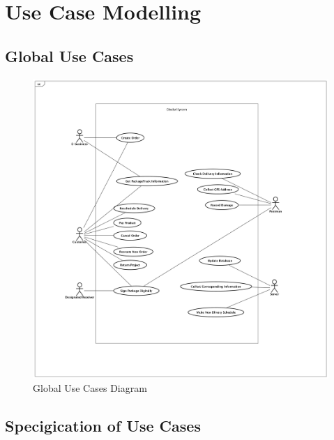 \documentclass[12pt]{scrreprt}
\begin{document}
\chapter{Use Case Modelling}
\section{Global Use Cases}
\begin{figure}[!htb]
  \centering\includegraphics[width=5.5in]{DocumentRes/0UseCaseDiagram.png}
  \caption{Global Use Cases Diagram}
\end{figure}

\section{Specigication of Use Cases}
\end{document}
